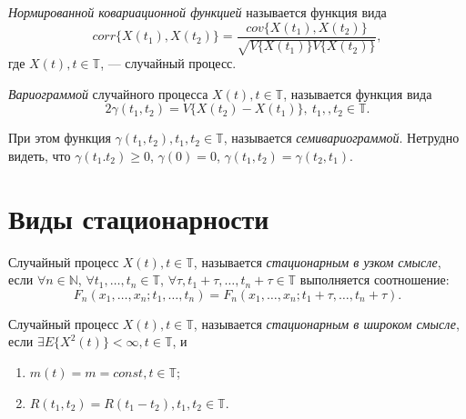 \begin{Definition}
\label{def:corr_cov}
	\textit{Нормированной ковариационной функцией} называется функция вида
	\begin{equation*}
		corr\{ X(t_1), X(t_2)\} = \frac{cov\{ X(t_1), X(t_2) \}}{\sqrt{ V\{ X(t_1) \} V\{ X(t_2) \} }},
	\end{equation*}
	где $ X(t), t \in \mathbb{T} $, --- случайный процесс.
\end{Definition}

\begin{Definition}
    \textit{Вариограммой} случайного процесса $ X(t), t \in \mathbb{T} $, называется функция вида
	\begin{equation}
	    2 \gamma (t_1, t_2) = V \{ X(t_2) - X(t_1) \},~ t_1,, t_2 \in \mathbb{T}.
	\end{equation}

	При этом функция $ \gamma (t_1, t_2), t_1, t_2 \in \mathbb{T} $, называется \textit{семивариограммой}. Нетрудно видеть, что $ \gamma(t_1. t_2) \ge 0 $, $ \gamma(0) = 0 $, $ \gamma(t_1, t_2) = \gamma(t_2, t_1) $.
\end{Definition}

\section{Виды стационарности}
\label{sec:variogramAndInnerStationarity}

\begin{Definition}
	Случайный процесс $ X(t), t \in \mathbb{T} $, называется \textit{стационарным в узком смысле}, если $ \forall n \in \mathbb{N} $, $ \forall t_1, \dots, t_n \in \mathbb{T} $, $ \forall \tau, t_1 + \tau, \dots, t_n + \tau \in \mathbb{T} $ выполняется соотношение:
	\begin{equation*}
		F_n(x_1, \dots, x_n; t_1, \dots, t_n) = F_n(x_1, \dots, x_n; t_1 + \tau , \dots, t_n + \tau).
	\end{equation*}
\end{Definition}

\begin{Definition}
\label{def:stat_wide}
	Случайный процесс $ X (t), t \in \mathbb{T} $, называется \textit{стационарным в широком смысле}, если $ \exists E \{ X^2(t) \} < \infty, t \in \mathbb{T} $, и
	\begin{enumerate}
		\item $ m(t) = m = const, t \in \mathbb{T} $;
		\item\label{prop:covTimeInvariance} $ R(t_1, t_2) = R(t_1 - t_2), t_1,t_2 \in \mathbb{T} $.
	\end{enumerate}
\end{Definition}

